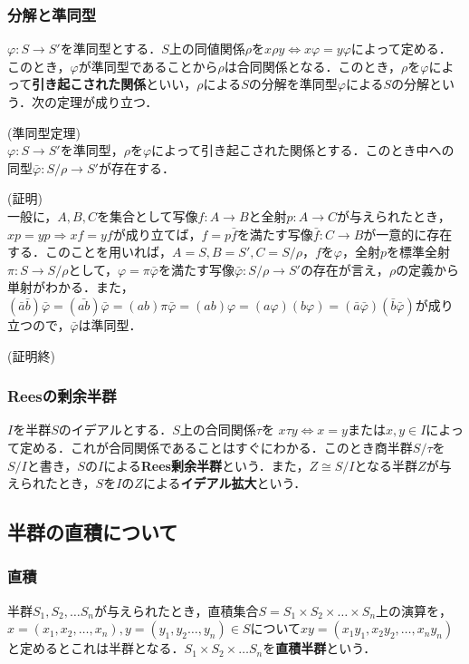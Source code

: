 \documentclass{jsarticle}
\begin{document}
\subsubsection{分解と準同型}
$\varphi:S\rightarrow S'$を準同型とする．$S$上の同値関係$\rho$を$x\rho y\iff x\varphi =y\varphi$によって定める．このとき，$\varphi$が準同型であることから$\rho$は合同関係となる．このとき，$\rho$を$\varphi$によって{\bf 引き起こされた関係}といい，$\rho$による$S$の分解を準同型$\varphi$による$S$の分解という．次の定理が成り立つ．
\begin{thm}(準同型定理)\\
$\varphi:S\rightarrow S'$を準同型，$\rho$を$\varphi$によって引き起こされた関係とする．このとき中への同型$\bar{\varphi}:S/\rho\rightarrow S'$が存在する．
\end{thm}
(証明)\\
一般に，$A,B,C$を集合として写像$f:A\rightarrow B$と全射$p:A\rightarrow C$が与えられたとき，$xp=yp\Rightarrow xf=yf$が成り立てば，$f=p\bar{f}$を満たす写像$\bar{f}:C\rightarrow B$が一意的に存在する．このことを用いれば，$A=S,B=S',C=S/\rho$，$f$を$\varphi$，全射$p$を標準全射$\pi:S\rightarrow S/\rho$として，$\varphi=\pi\bar{\varphi}$を満たす写像$\bar{\varphi}:S/\rho\rightarrow S'$の存在が言え，$\rho$の定義から単射がわかる．また，$(\bar{a}\bar{b})\bar{\varphi}=(\bar{ab})\bar{\varphi}=(ab)\pi\bar{\varphi}=(ab)\varphi=(a\varphi)(b\varphi)=(\bar{a}\bar{\varphi})(\bar{b}\bar{\varphi})$が成り立つので，$\bar{\varphi}$は準同型．
\begin{flushright}
(証明終)
\end{flushright}
\subsubsection{Reesの剰余半群}
$I$を半群$S$のイデアルとする．$S$上の合同関係$\tau$を
$x\tau y\iff x=y$または$x,y\in I$によって定める．これが合同関係であることはすぐにわかる．このとき商半群$S/\tau$を$S/I$と書き，$S$の$I$による{\bf Rees剰余半群}という．また，$Z\cong S/I$となる半群$Z$が与えられたとき，$S$を$I$の$Z$による{\bf イデアル拡大}という．
\subsection{半群の直積について}
\subsubsection{直積}
半群$S_1,S_2,\dots S_n$が与えられたとき，直積集合$S=S_1\times S_2\times\dots\times S_n$上の演算を，$x=(x_1,x_2,\dots ,x_n),y=(y_1,y_2\dots,y_n)\in S$について$xy=(x_1y_1,x_2y_2,\dots,x_ny_n)$と定めるとこれは半群となる．$S_1\times S_2\times\dots S_n$を{\bf 直積半群}という．
\end{document}
